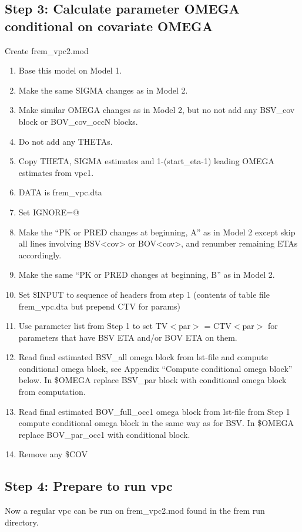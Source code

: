 \subsection{Step 3:  Calculate parameter OMEGA conditional on covariate OMEGA}
Create frem\_vpc2.mod
\begin{enumerate}
	\item Base this model on Model 1.
    \item Make the same SIGMA changes as in Model 2. 
    \item Make similar OMEGA changes as in Model 2, but no not add any BSV\_cov block or BOV\_cov\_occN blocks.
    \item Do not add any THETAs.
    \item Copy THETA, SIGMA estimates and 1-(start\_eta-1) leading OMEGA estimates from vpc1.
	\item DATA is frem\_vpc.dta
	\item Set IGNORE=@ 
    \item Make the ``PK or PRED changes at beginning, A'' as in Model 2 except skip all lines involving BSV<cov> or
    BOV<cov>, and renumber remaining ETAs accordingly.
    \item Make the same ``PK or PRED changes at beginning, B'' as in Model 2.
	\item Set \$INPUT to sequence of headers from step 1 (contents of table file frem\_vpc.dta but prepend CTV for params)
	\item Use parameter list from Step 1 to set TV$<$par$>$ = CTV$<$par$>$ for 
parameters that have BSV ETA and/or BOV ETA on them.
	\item Read final estimated BSV\_all omega block from lst-file and compute conditional omega block, 
    see Appendix “Compute conditional omega block” below. In \$OMEGA replace BSV\_par block with 
    conditional omega block from computation.
	\item Read final estimated BOV\_full\_occ1 omega block from lst-file from Step 1 compute conditional omega block 
    in the same way as for BSV. In \$OMEGA replace BOV\_par\_occ1 with conditional block.
    \item Remove any \$COV
\end{enumerate}

\subsection{Step 4: Prepare to run  vpc}
Now a regular vpc can be run on frem\_vpc2.mod found in the frem run directory.


